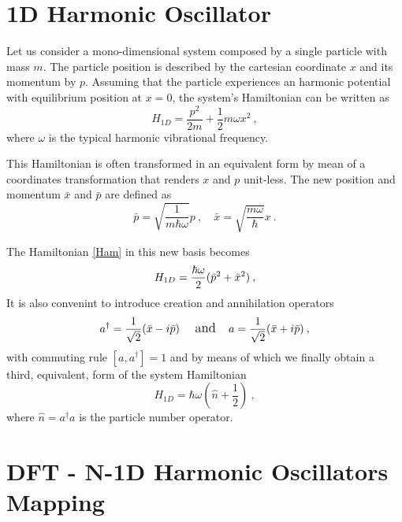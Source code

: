 \documentclass[%
 reprint,onecolumn,
 amsmath,amssymb,
aps,
]{revtex4-1}
\begin{document}
\section{1D Harmonic Oscillator}

Let us consider a mono-dimensional system composed by a single particle with mass $m$. The particle position is described by the cartesian coordinate $x$ and its momentum by $p$. 
Assuming that the particle experiences an harmonic potential with equilibrium position at $x=0$, the system's Hamiltonian can be written as
%
\begin{equation}
H_{1D}=\frac{p^{2}}{2m}+\frac{1}{2}m\omega x^{2}\:,
\label{Ham}
\end{equation}
%
where $\omega$ is the typical harmonic vibrational frequency. 

This Hamiltonian is often transformed in an equivalent form by mean of a coordinates transformation that renders $x$ and $p$ unit-less. 
The new position and momentum $\bar{x}$ and $\bar{p}$ are defined as
%
\begin{equation}
\bar{p}=\sqrt{\frac{1}{m\hbar\omega}}p \:,\quad \bar{x}=\sqrt{\frac{m\omega}{\hbar}}x  \:.
\end{equation}
%

The Hamiltonian \ref{Ham} in this new basis becomes 
%
\begin{equation}
H_{1D}=\frac{\hbar\omega}{2}\large( \bar{p}^{2} + \bar{x}^{2} \large) \:,
\label{Ham2}
\end{equation}
%
It is also convenint to introduce creation and annihilation operators 
%
\begin{equation}
a^{\dag}=\frac{1}{\sqrt{2}}\large(\bar{x}-i\bar{p}\large) \:\quad \text{and}\quad  a=\frac{1}{\sqrt{2}}\large(\bar{x}+i\bar{p}\large)\:,
\label{ladder}
\end{equation}
%
with commuting rule $[a,a^{\dag}]=1$ and by means of which we finally obtain a third, equivalent, form of the system Hamiltonian
%
\begin{equation}
H_{1D}=\hbar\omega(\hat{n}+\frac{1}{2}) \:,
\label{Ham3}
\end{equation}
where $\hat{n}=a^{\dag}a$ is the particle number operator. 



\section{DFT - N-1D Harmonic Oscillators Mapping}
\end{document}
